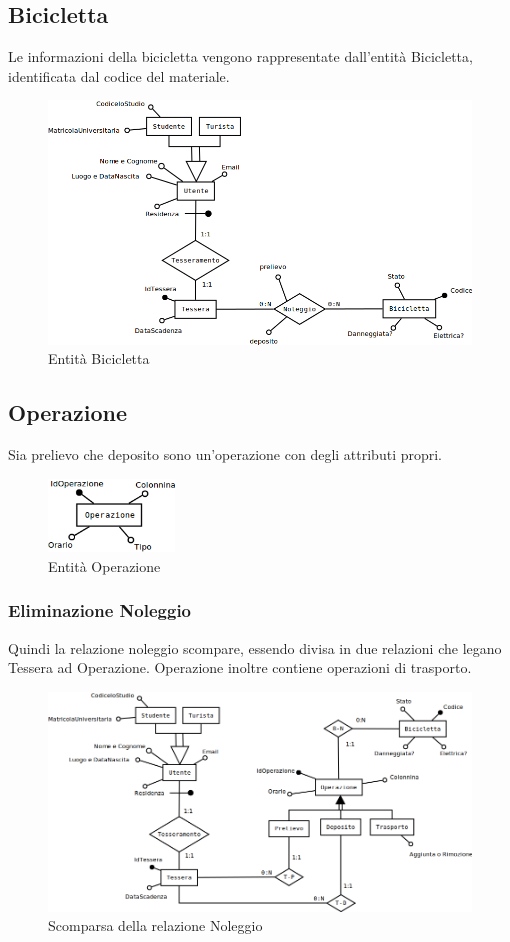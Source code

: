 \documentclass[a4paper,twoside]{article}
\begin{document}
\subsection{Bicicletta}
Le informazioni della bicicletta vengono rappresentate dall'entità Bicicletta, identificata dal codice del materiale.
\begin{figure}[H]
 \centering
  \includegraphics[width=1\textwidth]{Concettuale05}
\caption{Entità Bicicletta}
\end{figure}
\subsection{Operazione}
Sia prelievo che deposito sono un'operazione con degli attributi propri.
\begin{figure}[H]
 \centering
  \includegraphics[width=0.3\textwidth]{Concettuale06}
\caption{Entità Operazione}
\end{figure}
\subsubsection{Eliminazione Noleggio}
Quindi la relazione noleggio scompare, essendo divisa in due relazioni che legano Tessera ad Operazione. Operazione inoltre contiene operazioni di trasporto.
\begin{figure}[H]
 \centering
  \includegraphics[width=1\textwidth]{Concettuale07}
\caption{Scomparsa della relazione Noleggio}
\end{figure}
\end{document}
